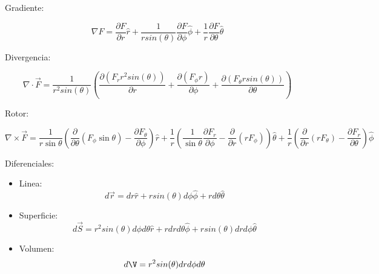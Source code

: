 \medbreak

Gradiente:

\[\nabla F = \frac{\partial F}{\partial r}\hat{r} + \frac{1}{rsin(\theta)}\frac{\partial F}{\partial \phi}\hat{\phi} + \frac{1}{r}\frac{\partial F}{\partial \theta}\hat{\theta}\]

Divergencia:

\[\nabla \cdot \vec{F} = \frac{1}{r^2sin(\theta)}\left(\frac{\partial(F_{r}r^2sin(\theta))}{\partial r}+\frac{\partial (F_{\phi}r)}{\partial\phi}+\frac{\partial(F_{\theta}rsin(\theta))}{\partial \theta}\right)\]

Rotor:

\[\nabla\times\vec{F} = \frac{1}{r\sin\theta} \left( \frac{\partial}{\partial \theta} \left(F_\phi\sin\theta \right) - \frac{\partial F_\theta}{\partial \phi} \right) \hat{r} + \frac{1}{r} \left( \frac{1}{\sin\theta} \frac{\partial F_r}{\partial \phi} - \frac{\partial}{\partial r} \left( r F_\phi \right) \right) \hat{\theta} + \frac{1}{r} \left( \frac{\partial}{\partial r} \left( r F_{\theta} \right) - \frac{\partial F_r}{\partial \theta} \right) \hat{\phi}\]

Diferenciales:

\begin{itemize}
    \item Linea:
    \[d\vec{r} = dr\hat{r} + rsin(\theta) d\phi\hat{\phi}+rd\theta\hat{\theta}\]
    \item Superficie:
    \[d\vec{S} = r^2sin(\theta)d\phi d\theta\hat{r}+rdrd\theta\hat{\phi}+rsin(\theta)dr d\phi\hat{\theta}\]
    \item Volumen:
    \[d\V = r^2sin(\theta)dr d\phi d\theta\]
\end{itemize}

\newpage